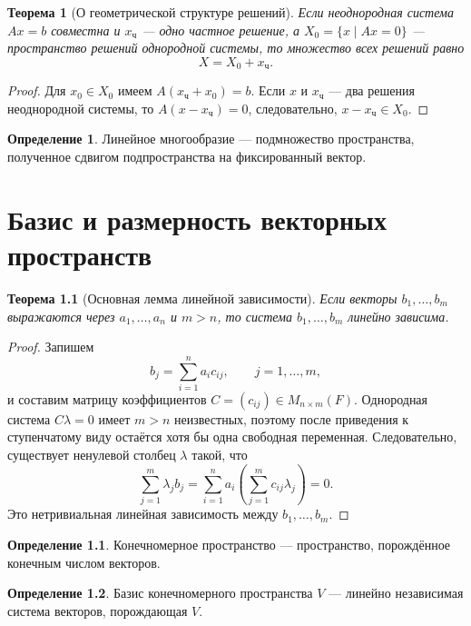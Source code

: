 \documentclass[12pt,a4paper,oneside,openany]{book}
\theoremstyle{definition}
\newtheorem{definition}{Определение}[chapter]
\theoremstyle{plain}
\newtheorem{theorem}{Теорема}[chapter]
\theoremstyle{remark}
\begin{document}
\begin{theorem}[О геометрической структуре решений]
Если неоднородная система $Ax=b$ совместна и $x_{\mathrm{ч}}$ --- одно
частное решение, а $X_0=\{x\mid Ax=0\}$ --- пространство решений
однородной системы, то множество всех решений равно
\[
  X=X_0+x_{\mathrm{ч}}.
\]
\end{theorem}

\begin{proof}
Для $x_0\in X_0$ имеем $A(x_{\mathrm{ч}}+x_0)=b$. Если $x$ и
$x_{\mathrm{ч}}$ --- два решения неоднородной системы, то
$A(x-x_{\mathrm{ч}})=0$, следовательно, $x-x_{\mathrm{ч}}\in X_0$.
\end{proof}

\begin{definition}
Линейное многообразие --- подмножество пространства, полученное сдвигом
подпространства на фиксированный вектор.
\end{definition}


\chapter{Базис и размерность векторных пространств}

\begin{theorem}[Основная лемма линейной зависимости]
Если векторы $b_1,\ldots,b_m$ выражаются через
$a_1,\ldots,a_n$ и $m>n$, то система $b_1,\ldots,b_m$ линейно зависима.
\end{theorem}

\begin{proof}
Запишем
\[
  b_j=\sum_{i=1}^{n}a_i c_{ij},\qquad j=1,\ldots,m,
\]
и составим матрицу коэффициентов $C=(c_{ij})\in M_{n\times m}(F)$.
Однородная система $C\lambda=0$ имеет $m>n$ неизвестных, поэтому после
приведения к ступенчатому виду остаётся хотя бы одна свободная переменная.
Следовательно, существует ненулевой столбец $\lambda$ такой, что
\[
  \sum_{j=1}^{m}\lambda_jb_j
  =\sum_{i=1}^{n}a_i\left(\sum_{j=1}^{m}c_{ij}\lambda_j\right)=0.
\]
Это нетривиальная линейная зависимость между $b_1,\ldots,b_m$.
\end{proof}

\begin{definition}
Конечномерное пространство --- пространство, порождённое конечным числом
векторов.
\end{definition}

\begin{definition}
Базис конечномерного пространства $V$ --- линейно независимая система
векторов, порождающая $V$.
\end{definition}
\end{document}
